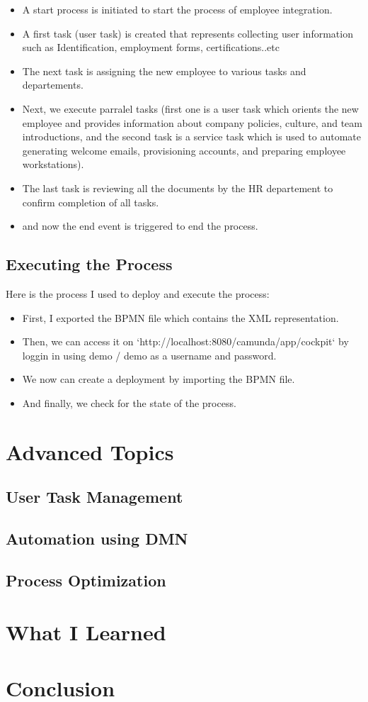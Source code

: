 \documentclass[12pt]{article}
\begin{document}
{\begin{itemize}
  \item A start process is initiated to start the process of employee integration.
  \item A first task (user task) is created that represents collecting user information such as Identification, employment forms, certifications..etc
  \item The next task is assigning the new employee to various tasks and departements.
  \item Next, we execute parralel tasks (first one is a user task which orients the new employee and provides information about company policies, culture, and team introductions, and the second task is a service task which is used to automate generating welcome emails, provisioning accounts, and preparing employee workstations).
  \item The last task is reviewing all the documents by the HR departement to confirm completion of all tasks.
  \item and now the end event is triggered to end the process.
\end{itemize}

  \subsection{Executing the Process}

Here is the process I used to deploy and execute the process:

\begin{itemize}
  \item First, I exported the BPMN file which contains the XML representation.
  \item Then, we can access it on `http://localhost:8080/camunda/app/cockpit` by loggin in using demo / demo as a username and password.
  \item We now can create a deployment by importing the BPMN file.
  \item And finally, we check for the state of the process.
\end{itemize}

\pagebreak

\section{Advanced Topics}
  \subsection{User Task Management}
  \subsection{Automation using DMN}
  \subsection{Process Optimization}

\pagebreak

\section{What I Learned}

\pagebreak

\section{Conclusion}

}

\printbibliography
\end{document}
